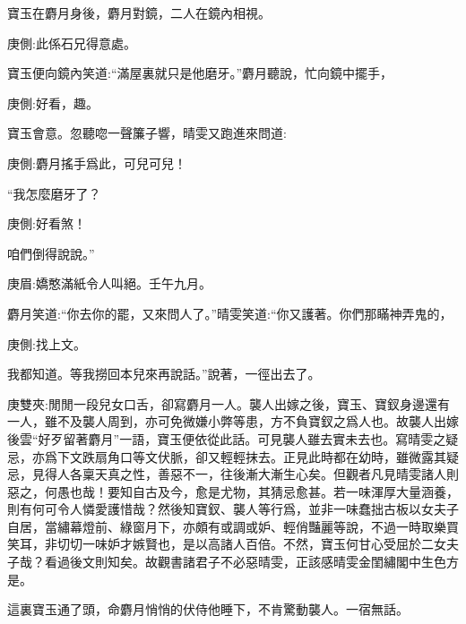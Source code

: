 \begin{parag}
    寶玉在麝月身後，麝月對鏡，二人在鏡內相視。\begin{note}庚側:此係石兄得意處。\end{note}寶玉便向鏡內笑道:“滿屋裏就只是他磨牙。”麝月聽說，忙向鏡中擺手，\begin{note}庚側:好看，趣。\end{note}寶玉會意。忽聽唿一聲簾子響，晴雯又跑進來問道:\begin{note}庚側:麝月搖手爲此，可兒可兒！\end{note}“我怎麼磨牙了？\begin{note}庚側:好看煞！\end{note}咱們倒得說說。”\begin{note}庚眉:嬌憨滿紙令人叫絕。壬午九月。\end{note}麝月笑道:“你去你的罷，又來問人了。”晴雯笑道:“你又護著。你們那瞞神弄鬼的，\begin{note}庚側:找上文。\end{note}我都知道。等我撈回本兒來再說話。”說著，一徑出去了。\begin{note}庚雙夾:閒閒一段兒女口舌，卻寫麝月一人。襲人出嫁之後，寶玉、寶釵身邊還有一人，雖不及襲人周到，亦可免微嫌小弊等患，方不負寶釵之爲人也。故襲人出嫁後雲“好歹留著麝月”一語，寶玉便依從此話。可見襲人雖去實未去也。寫晴雯之疑忌，亦爲下文跌扇角口等文伏脈，卻又輕輕抹去。正見此時都在幼時，雖微露其疑忌，見得人各稟天真之性，善惡不一，往後漸大漸生心矣。但觀者凡見晴雯諸人則惡之，何愚也哉！要知自古及今，愈是尤物，其猜忌愈甚。若一味渾厚大量涵養，則有何可令人憐愛護惜哉？然後知寶釵、襲人等行爲，並非一味蠢拙古板以女夫子自居，當繡幕燈前、綠窗月下，亦頗有或調或妒、輕俏豔麗等說，不過一時取樂買笑耳，非切切一味妒才嫉賢也，是以高諸人百倍。不然，寶玉何甘心受屈於二女夫子哉？看過後文則知矣。故觀書諸君子不必惡晴雯，正該感晴雯金閨繡閣中生色方是。\end{note}這裏寶玉通了頭，命麝月悄悄的伏侍他睡下，不肯驚動襲人。一宿無話。
\end{parag}


